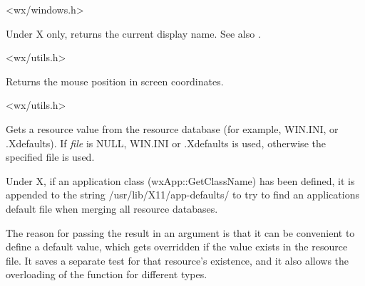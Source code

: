 
<wx/windows.h>

\label{wxgetdisplayname}


Under X only, returns the current display name. See also .


<wx/utils.h>

\label{wxgetmouseposition}


Returns the mouse position in screen coordinates.


<wx/utils.h>

\label{wxgetresource}





Gets a resource value from the resource database (for example, WIN.INI, or
.Xdefaults). If {\it file} is NULL, WIN.INI or .Xdefaults is used,
otherwise the specified file is used.

Under X, if an application class (wxApp::GetClassName) has been defined,
it is appended to the string /usr/lib/X11/app-defaults/ to try to find
an applications default file when merging all resource databases.

The reason for passing the result in an argument is that it
can be convenient to define a default value, which gets overridden
if the value exists in the resource file. It saves a separate
test for that resource's existence, and it also allows
the overloading of the function for different types.

